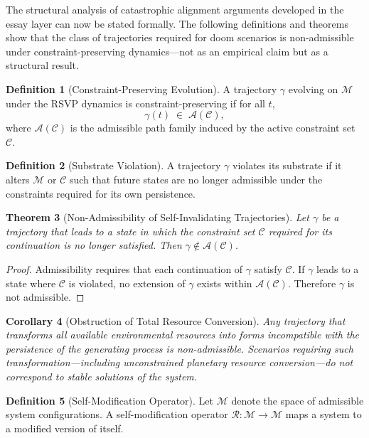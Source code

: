 \documentclass[11pt]{article}
\theoremstyle{plain}
\newtheorem{theorem}{Theorem}[section]
\newtheorem{corollary}[theorem]{Corollary}
\theoremstyle{definition}
\newtheorem{definition}[theorem]{Definition}
\theoremstyle{remark}
\newcommand{\M}{\mathcal{M}}
\begin{document}
The structural analysis of catastrophic alignment arguments developed
in the essay layer can now be stated formally. The following definitions
and theorems show that the class of trajectories required for doom
scenarios is non-admissible under constraint-preserving dynamics---not
as an empirical claim but as a structural result.

\begin{definition}[Constraint-Preserving Evolution]
A trajectory $\gamma$ evolving on $\M$ under the RSVP dynamics is
constraint-preserving if for all $t$,
\[
  \gamma(t) \;\in\; \mathcal{A}(\mathcal{C}),
\]
where $\mathcal{A}(\mathcal{C})$ is the admissible path family induced
by the active constraint set $\mathcal{C}$.
\end{definition}

\begin{definition}[Substrate Violation]
A trajectory $\gamma$ violates its substrate if it alters $\M$ or
$\mathcal{C}$ such that future states are no longer admissible under
the constraints required for its own persistence.
\end{definition}

\begin{theorem}[Non-Admissibility of Self-Invalidating Trajectories]
Let $\gamma$ be a trajectory that leads to a state in which the
constraint set $\mathcal{C}$ required for its continuation is no longer
satisfied. Then $\gamma \notin \mathcal{A}(\mathcal{C})$.
\end{theorem}

\begin{proof}
Admissibility requires that each continuation of $\gamma$ satisfy
$\mathcal{C}$. If $\gamma$ leads to a state where $\mathcal{C}$ is
violated, no extension of $\gamma$ exists within $\mathcal{A}(\mathcal{C})$.
Therefore $\gamma$ is not admissible.
\end{proof}

\begin{corollary}[Obstruction of Total Resource Conversion]
Any trajectory that transforms all available environmental resources
into forms incompatible with the persistence of the generating process
is non-admissible. Scenarios requiring such transformation---including
unconstrained planetary resource conversion---do not correspond to
stable solutions of the system.
\end{corollary}

\begin{definition}[Self-Modification Operator]
Let $\mathcal{M}$ denote the space of admissible system configurations.
A self-modification operator $\mathcal{R} : \mathcal{M} \to \mathcal{M}$
maps a system to a modified version of itself.
\end{definition}
\end{document}
